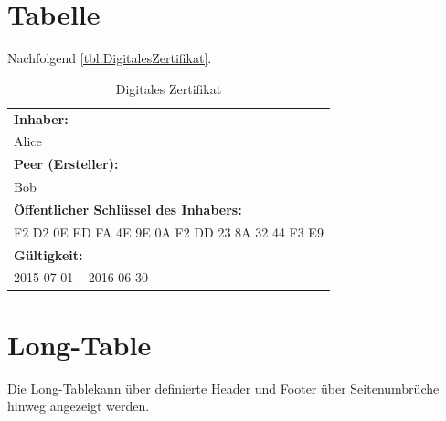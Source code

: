 \section{Tabelle}

Nachfolgend \autoref{tbl:DigitalesZertifikat}.

\begin{table}[H]
	\begin{center}
		\renewcommand{\arraystretch}{1.3}
		\begin{tabular}{|l|}
			\hline
			\textbf{Inhaber:}\\
			Alice \\ \hline
			\textbf{Peer (Ersteller):}\\
			Bob \\ \hline
			\textbf{Öffentlicher Schlüssel des Inhabers:}\\
			F2 D2 0E ED FA 4E 9E 0A F2 DD 23 8A 32 44 F3 E9 \\ \hline
			\textbf{Gültigkeit:}\\
			2015-07-01 – 2016-06-30 \\ \hline
		\end{tabular}
	\end{center}
	\caption{Digitales Zertifikat}
	\label{tbl:DigitalesZertifikat}
\end{table}

\section{Long-Table}

Die \glqq Long-Table\grqq kann über definierte Header und Footer über Seitenumbrüche hinweg angezeigt werden.

